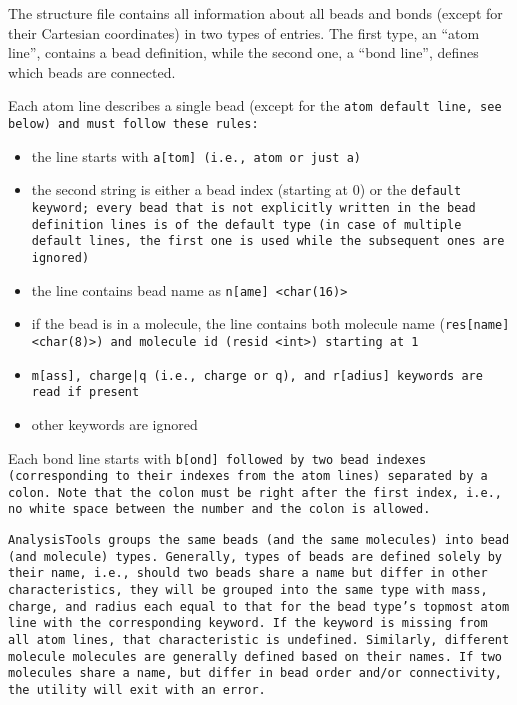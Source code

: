 The structure file contains all information about all beads and bonds
(except for their Cartesian coordinates) in two types of entries. The first
type, an \enquote{atom line}, contains a bead definition, while the second
one, a \enquote{bond line}, defines which beads are connected.

Each atom line describes a single bead (except for the \tt{atom default}
line, see below) and must follow these rules:

\begin{itemize}[topsep=0pt,itemsep=0pt]
  \item the line starts with \tt{a[tom]} (i.e., \tt{atom} or just \tt{a})
  \item the second string is either a bead index (starting at 0) or the
    \tt{default} keyword; every bead that is not explicitly written in the
    bead definition lines is of the \tt{default} type (in case of multiple
    \tt{default} lines, the first one is used while the subsequent ones are
    ignored)
  \item the line contains bead name as \tt{n[ame] <char(16)>}
  \item if the bead is in a molecule, the line contains both molecule name
    (\tt{res[name] <char(8)>}) and molecule id (\tt{resid <int>}) starting
    at 1
  \item \tt{m[ass]}, \tt{charge|q} (i.e., \tt{charge} or \tt{q}), and
    \tt{r[adius]} keywords are read if present
  \item other keywords are ignored
\end{itemize}

Each bond line starts with \tt{b[ond]} followed by two bead indexes
(corresponding to their indexes from the atom lines) separated by a colon.
Note that the colon must be right after the first index, i.e., no white
space between the number and the colon is allowed.

\tt{AnalysisTools} groups the same beads (and the same molecules) into bead
(and molecule) types. Generally, types of beads are defined solely by their
name, i.e., should two beads share a name but differ in other
characteristics, they will be grouped into the same type with mass, charge,
and radius each equal to that for the bead type's topmost atom line with
the corresponding keyword. If the keyword is missing from all atom lines,
that characteristic is undefined. Similarly, different molecule molecules
are generally defined based on their names. If two molecules share a name,
but differ in bead order and/or connectivity, the utility will exit with an
error.

